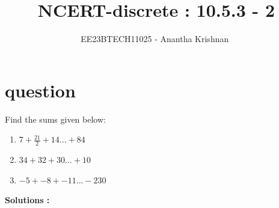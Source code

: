 \documentclass[journal,12pt,onecolumn]{IEEEtran}
\theoremstyle{remark}
\begin{document}

\vspace{3cm}

\title{NCERT-discrete : 10.5.3 - 2}
\author{EE23BTECH11025 - Anantha Krishnan $^{}$%
}
\maketitle
\bigskip



\section{question}

Find the sums given below:
\begin{enumerate}
    \item  $7 + \frac{21}{2} + 14 ... + 84$
    \item  $34 + 32 + 30 ... + 10$
    \item  $-5 + -8 + -11 ... -230$
\end{enumerate}

 



\textbf{Solutions :}
\fi

\end{document}
